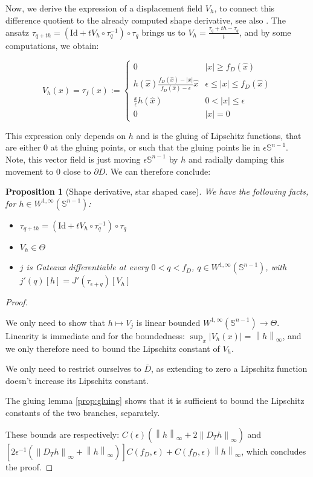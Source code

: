 \documentclass[english,a4paper,10pt,oneside]{scrbook}	%
\theoremstyle{break}
\newtheorem{prop}[equation]{Proposition}
\newenvironment{mproof}[1][\proofname]{%
  \begin{proof}[#1]$ $\par\nobreak\ignorespaces
}{%
  \end{proof}
}
\renewcommand*{\proofname}{Proof}
\theoremstyle{remark}
\newcommand{\mS}{\mathbb{S}^{n-1}}
\newcommand{\ds}{\displaystyle}
\newcommand{\norm}[1]{\left\lVert#1\right\rVert}
\newcommand{\id}{\text{Id}}
\newcommand{\Te}{\Theta}
\newcommand{\xh}{\hat{x}}
\newcommand{\eps}{\epsilon}
\begin{document}
Now, we derive the expression of a displacement field $V_h$, to connect this difference quotient to the already computed shape derivative, see also \cite{deckelnick}. The ansatz $\tau_{q+th}=(\id + tV_h\circ \tau_q^{-1})\circ \tau_q$ brings us to $V_h = \ds \frac{\tau_q+th-\tau_q}{t}$, and by some computations, we obtain: 

$$V_h(x) = \tau_f(x):=\left\{\begin{matrix}
 0 & |x|\geq f_D(\xh)\\ 
 h(\xh)\frac{f_D(\xh)-|x|}{f_D(\xh)-\eps}\xh & \eps \leq |x| \leq f_D(\xh) \\ 
 \frac{x}{\epsilon}h(\hat{x}) & 0<|x|\leq \eps\\ 
 0 & |x|=0
\end{matrix}\right.$$

This expression only depends on $h$ and is the gluing of Lipschitz functions, that are either $0$ at the gluing points, or such that the gluing points lie in $\eps\mS$. Note, this vector field is just moving $\eps \mS$ by $h$ and radially damping this movement to $0$ close to $\partial D$. We can therefore conclude:

\begin{prop}[Shape derivative, star shaped case]
We have the following facts, for $h \in W^{1,\infty}(\mS)$:

\begin{itemize}
	\item $\tau_{q+th}=(\id + tV_h\circ \tau_q^{-1})\circ \tau_q$
	\item $V_h \in \Te$
	\item $j$ is Gateaux differentiable at every $0<q<f_D$, $q \in W^{1,\infty}(\mS)$, with $j'(q)[h] = J'(\tau_{\eps+q})[V_h]$
\end{itemize}

\end{prop}
\begin{mproof}

We only need to show that $h\mapsto V_j$ is linear bounded $W^{1,\infty}(\mS)\rightarrow \Te$. Linearity is immediate and for the boundedness: $\sup_x|V_h(x)| = \norm{h}_\infty$, and we only therefore need to bound the Lipschitz constant of $V_h$. 

We only need to restrict ourselves to $\overline{D}$, as extending to zero a Lipschitz function doesn't increase its Lipschitz constant.

The gluing lemma \cref{prop:gluing} shows that it is sufficient to bound the Lipschitz constants of the two branches, separately.

These bounds are respectively: $C(\eps)(\norm{h}_\infty + 2\norm{D_T h}_\infty)$ and $[2\eps^{-1}(\norm{D_T h}_\infty + \norm{h}_\infty)]C(f_D,\eps) + C(f_D,\eps)\norm{h}_\infty$, which concludes the proof.

\end{mproof}
\end{document}
